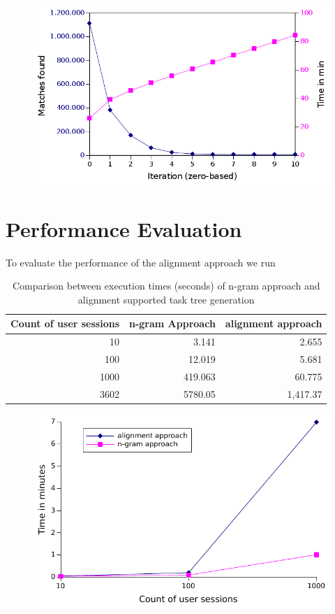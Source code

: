 	\begin{figure}[h!]
		\includegraphics[width=\textwidth]{chapters/casestudy/hasehase.png}
		\caption{}
		\label{fig:hasehase}
	\end{figure}


\section{Performance Evaluation}
To evaluate the performance of the alignment approach we run  
\begin{table}[h]
	\centering
\begin{tabular}{|r|r|r|}
	\hline
	\textbf{Count of user sessions} & \textbf{n-gram Approach} & \textbf{alignment approach} \\
	\hline
	  10 & 3.141 & 2.655 \\
	  100 & 12.019 & 5.681 \\
	  1000 & 419.063 & 60.775 \\
	  3602 & 5780.05 & 1,417.37 \\
	\hline
	 \end{tabular}
	 \caption{Comparison between execution times (seconds) of n-gram approach and alignment supported task tree generation}
	 \label{tab:comparisontasktreegenerations}
 \end{table}

 \begin{figure}[h]
	\includegraphics{chapters/casestudy/performance.pdf}
\end{figure}
